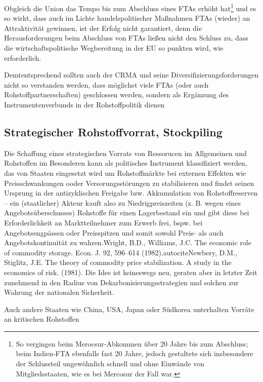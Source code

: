 \documentclass[12pt,a4paper,oneside]{book} %
\begin{document}
Obgleich die Union das Tempo bis zum Abschluss eines FTAs erhöht hat\footnote{So vergingen beim Merocsur-Abkommen über 20 Jahre bis zum Abschluss; beim Indien-FTA ebenfalls fast 20 Jahre, jedoch gestaltete sich insbesondere der Schlussteil ungewöhnlich schnell und ohne Einwände von Mitgliedsstaaten, wie es bei Mercosur der Fall war.} und es so wirkt, dass auch im Lichte handelspolitischer Maßnahmen FTAs (wieder) an Attraktivität gewinnen, ist der Erfolg nicht garantiert, denn die Herausforderungen beim Abschluss von FTAs ließen nicht den Schluss zu, \glqq dass die wirtschaftspolitische Wegbereitung in der EU so punkten wird, wie erforderlich\grqq.\autocite{Frenz 2025, S. 1103}

Demtentsprechend sollten auch der CRMA und seine Diversifizierungsforderungen nicht so verstanden werden, dass möglichst viele FTAs (oder auch Rohstoffpartnerschaften) geschlossen werden, sondern als Ergänzung des Instrumentenverbunds in der Rohstoffpolitik dienen

\subsection{Strategischer Rohstoffvorrat, Stockpiling}

Die Schaffung eines strategischen Vorrats von Ressorucen im Allgemeinen und Rohstoffen im Besonderen kann als politisches Instrument klassifiziert werden, das von Staaten eingesetzt wird um Rohstoffmärkte bei externen Effekten wie Preisschwankungen ooder Versorungsstörungen zu stabilisieren und findet seinen Ursprung in der antizyklischen Freigabe bzw. Akkumulation von Rohstoffreserven -- ein (staatlicher) Akteur kauft also zu Niedrigpreiszeiten (z. B. wegen eines Angebotsüberschusses) Rohstoffe für einen Lagerbestand ein und gibt diese bei Erforderlichkeit an Marktteilnehmer zum Erwerb frei, bspw. bei Angebotsengpässen oder Preisspitzen und somit sowohl Preis- als auch Angebotskontinuität zu wahren.\autocites{MPRA Paper No. 125317}{Wright, B.D., Williams, J.C. The economic role of commodity storage. Econ. J. 92, 596–614 (1982).}autocite{Newbery, D.M., Stiglitz, J.E. The theory of commodity price stabilization. A study in the economics of risk. (1981).} Die Idee ist keineswegs neu, geraten aber in letzter Zeit zunehmend in den Radius von Dekarbonisierungsstrategien und solchen zur Wahrung der nationalen Sicherheit.

Auch andere Staaten wie China, USA, Japan oder Südkorea unterhalten Vorräte an kritischen Rohstoffen
\end{document}
